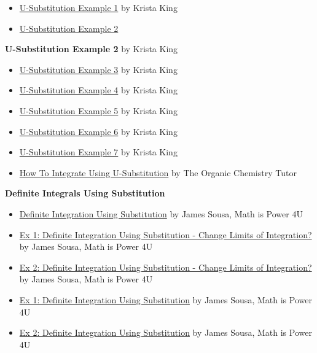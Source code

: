 \begin{itemize}
    \item \href{https://youtu.be/HHSepCzP56M}{U-Substitution Example 1} by Krista King
    \item \href{https://youtu.be/iRIhO-w46L0}{U-Substitution Example 2}
\end{itemize}

\textbf{U-Substitution Example 2} by Krista King
\begin{itemize}
    \item \href{https://youtu.be/w1FHS-XV64Q}{U-Substitution Example 3} by Krista King
    \item \href{https://youtu.be/_r6xMeO7aEw}{U-Substitution Example 4} by Krista King
    \item \href{https://youtu.be/gIj3objG09Q}{U-Substitution Example 5} by Krista King
    \item \href{https://youtu.be/TlUW6ZenNXY}{U-Substitution Example 6} by Krista King
    \item \href{https://youtu.be/W1WVFJ8iMqQ}{U-Substitution Example 7} by Krista King
\end{itemize}

\begin{itemize}
    \item \href{https://youtu.be/IAh00vU3FSY}{How To Integrate Using U-Substitution} by The Organic Chemistry Tutor
\end{itemize}

\textbf{Definite Integrals Using Substitution}
\begin{itemize}
    \item \href{https://www.youtube.com/watch?v=hjr27pv8pHQ}{Definite Integration Using Substitution} by James Sousa, Math is Power 4U
    \item \href{https://www.youtube.com/watch?v=jUwNl_PDeDY}{Ex 1: Definite Integration Using Substitution - Change Limits of Integration?} by James Sousa, Math is Power 4U
    \item \href{https://www.youtube.com/watch?v=n3DGt7cnS70}{Ex 2: Definite Integration Using Substitution - Change Limits of Integration?} by James Sousa, Math is Power 4U
    \item \href{https://www.youtube.com/watch?v=8ofGv7TQL34}{Ex 1: Definite Integration Using Substitution} by James Sousa, Math is Power 4U
    \item \href{https://www.youtube.com/watch?v=M-IUhe-iQx0}{Ex 2: Definite Integration Using Substitution} by James Sousa, Math is Power 4U
\end{itemize}

